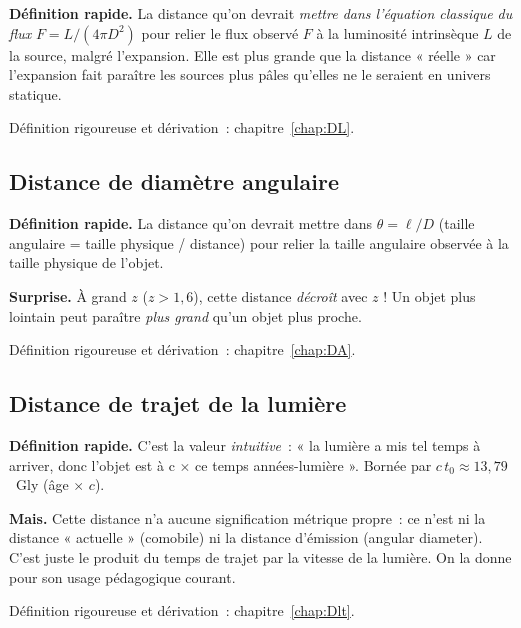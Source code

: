 \documentclass[11pt,a4paper,openany]{report}
\begin{document}
\begin{tcolorbox}[gui]
\textbf{Définition rapide.} La distance qu'on devrait \emph{mettre dans
l'équation classique du flux} $F = L/(4\pi D^2)$ pour relier le flux observé
$F$ à la luminosité intrinsèque $L$ de la source, malgré l'expansion. Elle
est plus grande que la distance « réelle » car l'expansion fait paraître
les sources plus pâles qu'elles ne le seraient en univers statique.

\medskip
Définition rigoureuse et dérivation~: chapitre~\ref{chap:DL}.
\end{tcolorbox}

\subsection{Distance de diamètre angulaire}

\begin{tcolorbox}[gui]
\textbf{Définition rapide.} La distance qu'on devrait mettre dans $\theta =
\ell/D$ (taille angulaire = taille physique / distance) pour relier la
taille angulaire observée à la taille physique de l'objet.

\medskip
\textbf{Surprise.} À grand $z$ ($z > 1{,}6$), cette distance \emph{décroît} avec
$z$ ! Un objet plus lointain peut paraître \emph{plus grand} qu'un objet plus
proche.

\medskip
Définition rigoureuse et dérivation~: chapitre~\ref{chap:DA}.
\end{tcolorbox}

\subsection{Distance de trajet de la lumière}

\begin{tcolorbox}[gui]
\textbf{Définition rapide.} C'est la valeur \emph{intuitive}~: « la lumière
a mis tel temps à arriver, donc l'objet est à c $\times$ ce temps
années-lumière ». Bornée par $c\,t_0 \approx 13{,}79$~Gly (âge $\times$ $c$).

\medskip
\textbf{Mais.} Cette distance n'a aucune signification métrique propre~: ce
n'est ni la distance « actuelle » (comobile) ni la distance d'émission
(angular diameter). C'est juste le produit du temps de trajet par la vitesse
de la lumière. On la donne pour son usage pédagogique courant.

\medskip
Définition rigoureuse et dérivation~: chapitre~\ref{chap:Dlt}.
\end{tcolorbox}
\end{document}
